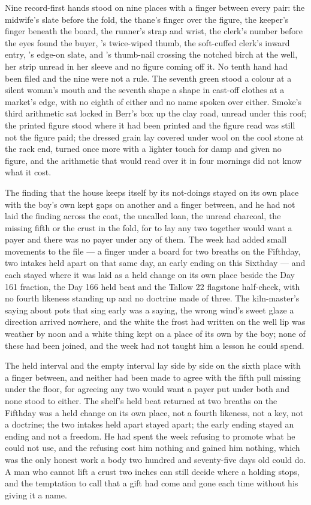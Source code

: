 Nine record-first hands stood on nine places with a finger between every pair: the midwife's slate before the fold, the thane's finger over the figure, the keeper's finger beneath the board, the runner's strap and wrist, the clerk's number before the eyes found the buyer, 's twice-wiped thumb, the soft-cuffed clerk's inward entry, 's edge-on slate, and 's thumb-nail crossing the notched birch at the well, her strip unread in her sleeve and no figure coming off it. No tenth hand had been filed and the nine were not a rule. The seventh green stood a colour at a silent woman's mouth and the seventh shape a shape in cast-off clothes at a market's edge, with no eighth of either and no name spoken over either. Smoke's third arithmetic sat locked in Berr's box up the clay road, unread under this roof; the printed figure stood where it had been printed and the figure read was still not the figure paid; the dressed grain lay covered under wool on the cool stone at the rack end, turned once more with a lighter touch for damp and given no figure, and the arithmetic that would read over it in four mornings did not know what it cost.

The finding that the house keeps itself by its not-doings stayed on its own place with the boy's own kept gaps on another and a finger between, and he had not laid the finding across the coat, the uncalled loan, the unread charcoal, the missing fifth or the crust in the fold, for to lay any two together would want a payer and there was no payer under any of them. The week had added small movements to the file --- a finger under a board for two breaths on the Fifthday, two intakes held apart on that same day, an early ending on this Sixthday --- and each stayed where it was laid as a held change on its own place beside the Day 161 fraction, the Day 166 held beat and the Tallow 22 flagstone half-check, with no fourth likeness standing up and no doctrine made of three. The kiln-master's saying about pots that sing early was a saying, the wrong wind's sweet glaze a direction arrived nowhere, and the white the frost had written on the well lip was weather by noon and a white thing kept on a place of its own by the boy; none of these had been joined, and the week had not taught him a lesson he could spend.

\scenebreak

The held interval and the empty interval lay side by side on the sixth place with a finger between, and neither had been made to agree with the fifth pull missing under the floor, for agreeing any two would want a payer put under both and none stood to either. The shelf's held beat returned at two breaths on the Fifthday was a held change on its own place, not a fourth likeness, not a key, not a doctrine; the two intakes held apart stayed apart; the early ending stayed an ending and not a freedom. He had spent the week refusing to promote what he could not use, and the refusing cost him nothing and gained him nothing, which was the only honest work a body two hundred and seventy-five days old could do. A man who cannot lift a crust two inches can still decide where a holding stops, and the temptation to call that a gift had come and gone each time without his giving it a name.

